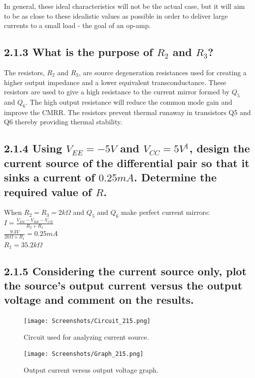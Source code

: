 \documentclass[12pt]{article}
\begin{document}
In general, these ideal characteristics will not be the actual case, but it will aim to be as close to these idealistic values as possible in order to deliver large currents to a small load - the goal of an op-amp.

\subsection*{2.1.3 What is the purpose of $R_2$ and $R_3$?}

The resistors, $R_2$ and $R_3$, are source degeneration resistances used for creating a higher output impedance and a lower equivalent transconductance. These resistors are used to give a high resistance to the current mirror formed by $Q_5$ and $Q_6$. The high output resistance will reduce the common mode gain and improve the CMRR. The resistors prevent thermal runaway in transistors Q5 and Q6 thereby providing thermal stability.

\subsection*{2.1.4 Using $V_{EE} = -5V$ and $V_{CC} = 5V^1$, design the current source of the differential pair so that it sinks a current of $0.25mA$. Determine the required value of $R$.}

When $R_2 = R_3 = 2k\Omega$ and $Q_5$ and $Q_6$ make perfect current mirrors: \\

$I = \frac{V_{EE} - V_{BE} - V_{CE}}{R_2 + R_1}$ \\

$\frac{9.3V}{2k\Omega + R_1} = 0.25mA$ \\

$R_1 = 35.2k\Omega$


\subsection*{2.1.5 Considering the current source only, plot the source’s output current versus the output voltage and comment on the results.}

\begin{figure}[H]
\centering
\texttt{[image: Screenshots/Circuit\_215.png]}
\caption{\label{fig:current-circuit} Circuit used for analyzing current source.}
\end{figure}

\begin{figure}[H]
\centering
\texttt{[image: Screenshots/Graph\_215.png]}
\caption{\label{fig:current-voltage} Output current versus output voltage graph.}
\end{figure}
\end{document}
